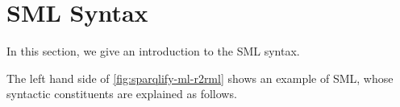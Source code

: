 \section{SML Syntax}
\label{sec:syntax}

In this section, we give an introduction to the SML syntax.

The left hand side of \autoref{fig:sparqlify-ml-r2rml} shows an example of SML,
whose syntactic constituents are explained as follows.


%



%



